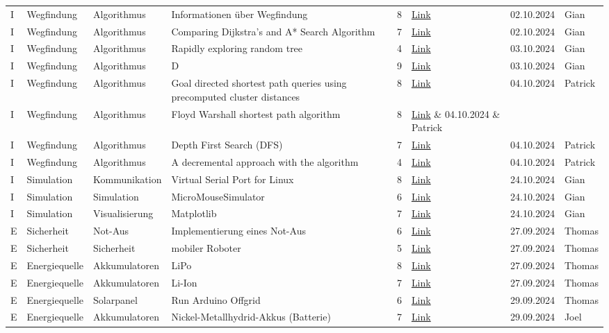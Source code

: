 \documentclass[../main.tex]{subfiles}
\begin{document}
\begin{longtable}{lp{2cm}p{2cm}p{4cm}clcl}
I & Wegfindung & Algorithmus & Informationen über Wegfindung & 8 &
\href{https://de.wikipedia.org/wiki/Pathfinding}{Link} & 02.10.2024 & Gian
\tabularnewline
I & Wegfindung & Algorithmus & Comparing Dijkstra’s and A* Search Algorithm & 7 &
\href{https://medium.com/@miguell.m/dijkstras-and-a-search-algorithm-2e67029d7749}{Link}
& 02.10.2024 & Gian
\tabularnewline
I & Wegfindung & Algorithmus & Rapidly exploring random tree & 4 &
\href{https://en.wikipedia.org/wiki/Rapidly_exploring_random_tree}{Link}
& 03.10.2024 & Gian
\tabularnewline
I & Wegfindung & Algorithmus & D\* & 9 &
\href{https://en.wikipedia.org/wiki/D*}{Link} & 03.10.2024 & Gian
\tabularnewline
I & Wegfindung & Algorithmus & Goal directed shortest path queries using precomputed cluster distances & 8 &
\href{https://publikationen.bibliothek.kit.edu/1000009512}{Link} & 04.10.2024 & Patrick
\tabularnewline
I & Wegfindung & Algorithmus & Floyd Warshall shortest path algorithm & 8 &
\href{https://en.wikipedia.org/wiki/Floyd%E2%80%93Warshall_algorithm}{Link} & 04.10.2024 & Patrick
\tabularnewline
I & Wegfindung & Algorithmus & Depth First Search (DFS) & 7 &
\href{https://en.wikipedia.org/wiki/Depth-first_search}{Link} & 04.10.2024 & Patrick
\tabularnewline
I & Wegfindung & Algorithmus & A decremental approach with the \* algorithm & 4 &
\href{https://doi.org/10.1016/j.measurement.2014.10.014}{Link} & 04.10.2024 & Patrick
\tabularnewline

I & Simulation & Kommunikation & Virtual Serial Port for Linux & 8 &
\href{https://stackoverflow.com/questions/52187/virtual-serial-port-for-linux}{Link} & 24.10.2024 & Gian
\tabularnewline
I & Simulation & Simulation & MicroMouseSimulator & 6 &
\href{https://github.com/mackorone/mms}{Link} & 24.10.2024 & Gian
\tabularnewline
I & Simulation & Visualisierung & Matplotlib & 7 &
\href{https://matplotlib.org/}{Link} & 24.10.2024 & Gian
\tabularnewline

E & Sicherheit & Not-Aus & Implementierung eines Not-Aus & 6 &
\href{https://www.eaton.com/ie/en-gb/markets/machine-building/service-and-support-machine-building-moem-service-eaton/blogs/emergency-stop-circuit---blogs---eaton.html}{Link} & 27.09.2024 & Thomas
\tabularnewline
E & Sicherheit & Sicherheit & mobiler Roboter & 5 & \href{https://tuprints.ulb.tu-darmstadt.de/18674/1/10.1524_auto.51.10.435.19576.pdf}{Link} & 27.09.2024 & Thomas 
\tabularnewline

E & Energiequelle & Akkumulatoren & LiPo & 8 & \href{https://www.lion-care.com/lipo-akkus-eigenschaften-vorteile-und-mehr}{Link} & 27.09.2024 & Thomas
\tabularnewline
E & Energiequelle & Akkumulatoren & Li-Ion & 7 & \href{https://poleenergy.ch/shop_content.php?coID=32}{Link} & 27.09.2024 & Thomas
\tabularnewline
E & Energiequelle & Solarpanel & Run Arduino Offgrid & 6 & \href{https://voltaicsystems.com/solar-arduino-guide/}{Link} & 29.09.2024 & Thomas
\tabularnewline
E & Energiequelle & Akkumulatoren & Nickel-Metallhydrid-Akkus \newline (Batterie) & 7 & \href{https://voltaicsystems.com/solar-arduino-guide/}{Link} & 29.09.2024 & Joel
\tabularnewline


\end{longtable}
\end{document}
